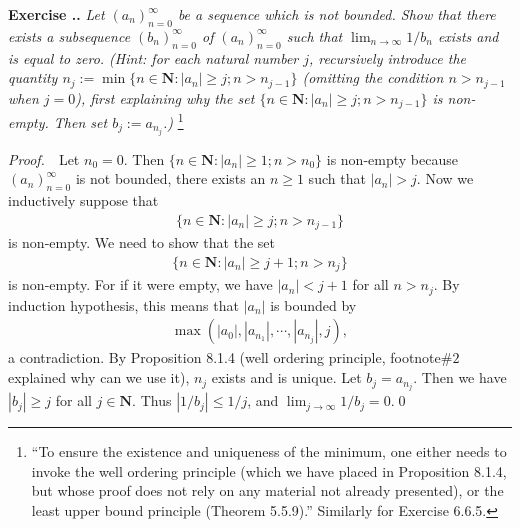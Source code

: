 \documentclass{book}
\newcommand{\pff}{\vspace{.25em}\noindent\emph{Proof.}~~}
\newcounter{Exercise}[section]
\renewcommand{\theExercise}{\thesection.\arabic{Exercise}.}
\newcommand{\new}{\vspace{1.5em}\noindent\textbf{{Exercise \stepcounter{Exercise}\textbf{\theExercise}}} }
\begin{document}
\new\emph{Let $(a_n)_{n=0}^\infty$ be a sequence which is not bounded. Show that there exists a subsequence $(b_n)_{n=0}^\infty$ of $(a_n)_{n=0}^\infty$ such that $\lim_{n\to\infty}1/b_n$ exists and is equal to zero. (Hint: for each natural number $j$, recursively introduce the quantity $n_j:=\min\{n\in\mathbf{N}:|a_n|\geq j;n>n_{j-1}\}$ (omitting the condition $n>n_{j-1}$ when $j=0$), first explaining why the set $\{n\in\mathbf{N}:|a_n|\geq j;n>n_{j-1}\}$ is non-empty. Then set $b_j:=a_{n_j}$.)}
\footnote{``To ensure the existence and uniqueness of the minimum, one either needs to invoke the well ordering principle (which we have placed in Proposition 8.1.4, but whose proof does not rely on any material not already presented), or the least upper bound principle (Theorem 5.5.9).'' Similarly for Exercise 6.6.5.}

\pff Let $n_0=0$. Then $\{n\in\mathbf{N}:|a_n|\geq 1;n>n_{0}\}$ is non-empty because $(a_n)_{n=0}^\infty$ is not bounded, there exists an $n\geq 1$ such that $|a_n|>j$. Now we inductively suppose that
    \begin{align*}
        \{n\in\mathbf{N}:|a_n|\geq j;n>n_{j-1}\}
    \end{align*}
is non-empty. We need to show that the set
    \begin{align*}
        \{n\in\mathbf{N}:|a_n|\geq j+1;n>n_{j}\}
    \end{align*}
is non-empty. For if it were empty, we have $|a_n|<j+1$ for all $n>n_j$. By induction hypothesis, this means that $|a_n|$ is bounded by
    \begin{align*}
        \max(|a_0|,|a_{n_1}|,\cdots,|a_{n_j}|,j),
    \end{align*}
a contradiction. By Proposition 8.1.4 (well ordering principle, footnote$\#2$ explained why can we use it), $n_j$ exists and is unique. Let $b_j=a_{n_j}$. Then we have $|b_j|\geq j$ for all $j\in\mathbf{N}$. Thus $|1/b_j|\leq 1/j$, and $\lim_{j\to\infty}1/b_j=0$.\qed
\begin{comment}
\pff Let $n_0=0$, and we recursively define that $n_j:=\min\{n\in\mathbf{N}:|a_n|\geq j;n>n_{j-1}\}$ for all $j\geq 1$. To show that $\{n\in\mathbf{N}:|a_n|\geq j;n>n_{j-1}\}$ is non-empty, we suppose for sake of contradiction that there exists a $J\geq 1$ such that $|a_n|<J$ for all $n>n_{J-1}$. This means $(a_n)_{n=0}^\infty$ is bounded by $\min(|a_{0}|,|a_{n_1}|,\cdots,|a_{n_{J-1}}|,J)$, a contradiction. Let $b_j=a_{n_j}$. Then we have $|b_j|\geq j$ for all $j\in\mathbf{N}$. Thus $|1/b_j|\leq 1/j$, and $\lim_{j\to\infty}1/b_j=0$.\qed
\end{comment}
\end{document}
